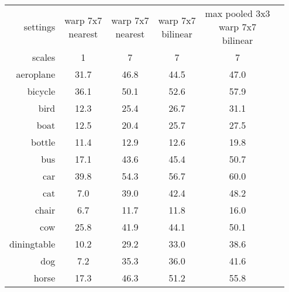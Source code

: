 \begin{tabular}{@{}rccccl@{}}
\toprule
settings      & \mcell{warp 7x7\\nearest}  & \mcell{warp 7x7\\nearest}  & \mcell{warp 7x7\\bilinear}  & \mcell{max pooled 3x3\\warp 7x7\\bilinear} \\
scales        & 1                          & 7                           & 7                          & 7 \\
\midrule
aeroplane     & 31.7                       & 46.8                        & 44.5                       & 47.0 \\
bicycle       & 36.1                       & 50.1                        & 52.6                       & 57.9 \\
bird          & 12.3                       & 25.4                        & 26.7                       & 31.1 \\
boat          & 12.5                       & 20.4                        & 25.7                       & 27.5 \\
bottle        & 11.4                       & 12.9                        & 12.6                       & 19.8 \\
bus           & 17.1                       & 43.6                        & 45.4                       & 50.7 \\
car           & 39.8                       & 54.3                        & 56.7                       & 60.0 \\
cat           & 7.0                        & 39.0                        & 42.4                       & 48.2 \\
chair         & 6.7                        & 11.7                        & 11.8                       & 16.0 \\
cow           & 25.8                       & 41.9                        & 44.1                       & 50.1 \\
diningtable   & 10.2                       & 29.2                        & 33.0                       & 38.6 \\
dog           & 7.2                        & 35.3                        & 36.0                       & 41.6 \\
horse         & 17.3                       & 46.3                        & 51.2                       & 55.8 \\

\end{tabular}
